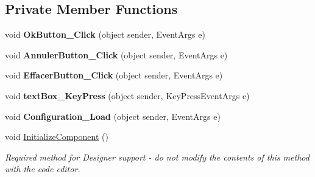 \subsection*{Private Member Functions}
\begin{DoxyCompactItemize}
\item 
void {\bfseries Ok\+Button\+\_\+\+Click} (object sender, Event\+Args e)\hypertarget{class_interface_graphique_1_1_configuration_a89cdf98843614178afb57da370dc9d95}{}\label{class_interface_graphique_1_1_configuration_a89cdf98843614178afb57da370dc9d95}

\item 
void {\bfseries Annuler\+Button\+\_\+\+Click} (object sender, Event\+Args e)\hypertarget{class_interface_graphique_1_1_configuration_a27f0d7174c5b5c65e92ae336abccdb8f}{}\label{class_interface_graphique_1_1_configuration_a27f0d7174c5b5c65e92ae336abccdb8f}

\item 
void {\bfseries Effacer\+Button\+\_\+\+Click} (object sender, Event\+Args e)\hypertarget{class_interface_graphique_1_1_configuration_a138fd8147f61a84316c6f60c59336489}{}\label{class_interface_graphique_1_1_configuration_a138fd8147f61a84316c6f60c59336489}

\item 
void {\bfseries text\+Box\+\_\+\+Key\+Press} (object sender, Key\+Press\+Event\+Args e)\hypertarget{class_interface_graphique_1_1_configuration_abcc6decf81c7d7fe08156ba5e0025b7b}{}\label{class_interface_graphique_1_1_configuration_abcc6decf81c7d7fe08156ba5e0025b7b}

\item 
void {\bfseries Configuration\+\_\+\+Load} (object sender, Event\+Args e)\hypertarget{class_interface_graphique_1_1_configuration_adc29ac6130f23925e7084d8a75b782b7}{}\label{class_interface_graphique_1_1_configuration_adc29ac6130f23925e7084d8a75b782b7}

\item 
void \hyperlink{class_interface_graphique_1_1_configuration_a87e13984f0bc9838b16abede43d8f024}{Initialize\+Component} ()
\begin{DoxyCompactList}\small\item\em Required method for Designer support -\/ do not modify the contents of this method with the code editor. \end{DoxyCompactList}\end{DoxyCompactItemize}
